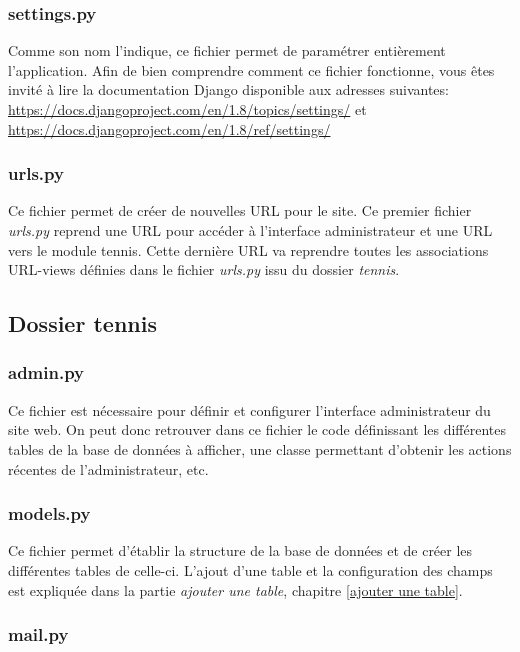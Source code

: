 \subsubsection{settings.py}

Comme son nom l'indique, ce fichier permet de paramétrer entièrement l'application. Afin de bien comprendre comment ce fichier fonctionne, vous êtes invité à lire la documentation Django disponible aux adresses suivantes: \url{https://docs.djangoproject.com/en/1.8/topics/settings/} et \url{https://docs.djangoproject.com/en/1.8/ref/settings/}

\subsubsection{urls.py}

Ce fichier permet de créer de nouvelles URL pour le site. Ce premier fichier \textit{urls.py} reprend une URL pour accéder à l'interface administrateur et une URL vers le module tennis. Cette dernière URL va reprendre toutes les associations URL-views définies dans le fichier \textit{urls.py} issu du dossier \textit{tennis}.

\subsection{Dossier tennis}

\subsubsection{admin.py}

Ce fichier est nécessaire pour définir et configurer l'interface administrateur du site web. On peut donc retrouver dans ce fichier le code définissant les différentes tables de la base de données à afficher, une classe permettant d'obtenir les actions récentes de l'administrateur, etc.

\subsubsection{models.py}

Ce fichier permet d'établir la structure de la base de données et de créer les différentes tables de celle-ci. L'ajout d'une table et la configuration des champs est expliquée dans la partie \textit{ajouter une table}, chapitre \ref{ajouter une table}.

\subsubsection{mail.py}

